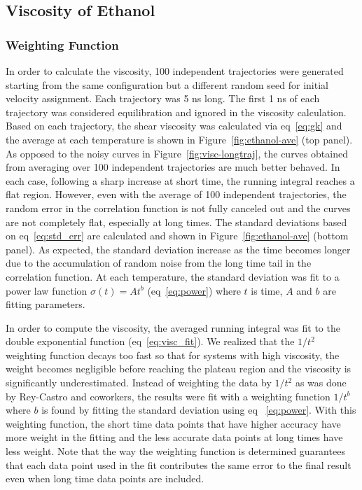 \documentclass[12pt]{article}
\begin{document}
\subsection{Viscosity of Ethanol}

\subsubsection{Weighting Function}

In order to calculate the viscosity,
100 independent trajectories were generated starting from the same configuration but a different random seed for initial velocity assignment.
Each trajectory was 5 ns long.
The first 1 ns of each trajectory was considered equilibration and ignored in the viscosity calculation.
Based on each trajectory, 
the shear viscosity was calculated via eq~\ref{eq:gk} 
and the average at each temperature is shown in Figure~\ref{fig:ethanol-ave} (top panel).
As opposed to the noisy curves in Figure~\ref{fig:visc-longtraj},
the curves obtained from averaging over 100 independent trajectories are much better behaved.
In each case, following a sharp increase at short time,
the running integral reaches a flat region.
However, even with the average of 100 independent trajectories,
the random error in the correlation function is not fully canceled out and the curves are not completely flat,
especially at long times.
The standard deviations based on eq~\ref{eq:std_err} are calculated and shown in Figure~\ref{fig:ethanol-ave} (bottom panel).
As expected, the standard deviation increase as the time becomes longer due to the accumulation of random noise from the long time tail in the correlation function.
\cite{Verlet.PRA.7.1690.1973}
At each temperature,
the standard deviation was fit to a power law function $\sigma(t) = At^{b}$ (eq~\ref{eq:power}) 
where $t$ is time, $A$ and $b$ are fitting parameters.

In order to compute the viscosity,
the averaged running integral was fit to the double exponential function (eq~\ref{eq:visc_fit}).
\cite{Rey-Castro.JPC.B.110.14426.2006}
We realized that the $1/t^2$ weighting function decays too fast 
so that for systems with high viscosity, 
the weight becomes negligible before reaching the plateau region
and the viscosity is significantly underestimated. Instead of weighting the data by $1/t^2$ as was done by Rey-Castro and coworkers,
\cite{Rey-Castro.JPC.B.110.14426.2006}
the results were fit with a weighting function $1/t^b$ where $b$ is found by fitting the standard deviation using eq~ \ref{eq:power}.
With this weighting function,
the short time data points that have higher accuracy have more weight in the fitting
and the less accurate data points at long times have less weight.
Note that the way the weighting function is determined guarantees 
that each data point used in the fit contributes the same error to the final result
even when long time data points are included.
\end{document}
